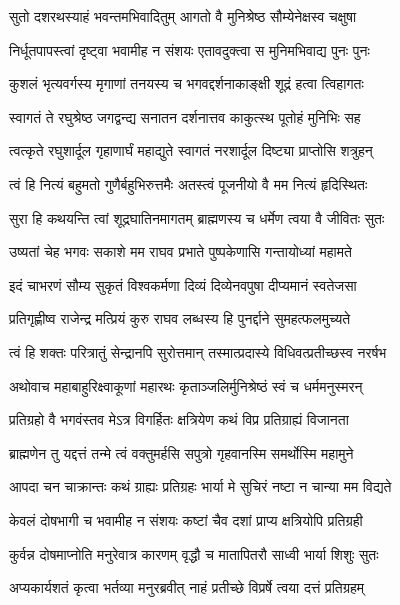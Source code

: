 \twolineshloka
{सुतो दशरथस्याहं भवन्तमभिवादितुम्}
{आगतो वै मुनिश्रेष्ठ सौम्येनेक्षस्व चक्षुषा}%

\twolineshloka
{निर्धूतपापस्त्वां दृष्ट्वा भवामीह न संशयः}
{एतावदुक्त्वा स मुनिमभिवाद्य पुनः पुनः}%

\twolineshloka
{कुशलं भृत्यवर्गस्य मृगाणां तनयस्य च}
{भगवद्दर्शनाकाङ्क्षी शूद्रं हत्वा त्विहागतः}%


\twolineshloka
{स्वागतं ते रघुश्रेष्ठ जगद्वन्द्य सनातन}
{दर्शनात्तव काकुत्स्थ पूतोहं मुनिभिः सह}%

\twolineshloka
{त्वत्कृते रघुशार्दूल गृहाणार्घं महाद्युते}
{स्वागतं नरशार्दूल दिष्ट्या प्राप्तोसि शत्रुहन्}%

\twolineshloka
{त्वं हि नित्यं बहुमतो गुणैर्बहुभिरुत्तमैः}
{अतस्त्वं पूजनीयो वै मम नित्यं हृदिस्थितः}%

\twolineshloka
{सुरा हि कथयन्ति त्वां शूद्रघातिनमागतम्}
{ब्राह्मणस्य च धर्मेण त्वया वै जीवितः सुतः}%

\twolineshloka
{उष्यतां चेह भगवः सकाशे मम राघव}
{प्रभाते पुष्पकेणासि गन्तायोध्यां महामते}%

\twolineshloka
{इदं चाभरणं सौम्य सुकृतं विश्वकर्मणा}
{दिव्यं दिव्येनवपुषा दीप्यमानं स्वतेजसा}%

\twolineshloka
{प्रतिगृह्णीष्व राजेन्द्र मत्प्रियं कुरु राघव}
{लब्धस्य हि पुनर्द्दाने सुमहत्फलमुच्यते}%

\twolineshloka
{त्वं हि शक्तः परित्रातुं सेन्द्रानपि सुरोत्तमान्}
{तस्मात्प्रदास्ये विधिवत्प्रतीच्छस्व नरर्षभ}%

\twolineshloka
{अथोवाच महाबाहुरिक्ष्वाकूणां महारथः}
{कृताञ्जलिर्मुनिश्रेष्ठं स्वं च धर्ममनुस्मरन्}%

\twolineshloka
{प्रतिग्रहो वै भगवंस्तव मेऽत्र विगर्हितः}
{क्षत्रियेण कथं विप्र प्रतिग्राह्यं विजानता}%

\twolineshloka
{ब्राह्मणेन तु यद्दत्तं तन्मे त्वं वक्तुमर्हसि}
{सपुत्रो गृहवानस्मि समर्थोस्मि महामुने}%

\twolineshloka
{आपदा चन चाक्रान्तः कथं ग्राह्यः प्रतिग्रहः}
{भार्या मे सुचिरं नष्टा न चान्या मम विद्यते}%

\twolineshloka
{केवलं दोषभागी च भवामीह न संशयः}
{कष्टां चैव दशां प्राप्य क्षत्रियोपि प्रतिग्रही}%

\twolineshloka
{कुर्वन्न दोषमाप्नोति मनुरेवात्र कारणम्}
{वृद्धौ च मातापितरौ साध्वी भार्या शिशुः सुतः}%

\twolineshloka
{अप्यकार्यशतं कृत्वा भर्तव्या मनुरब्रवीत्}
{नाहं प्रतीच्छे विप्रर्षे त्वया दत्तं प्रतिग्रहम्}%

